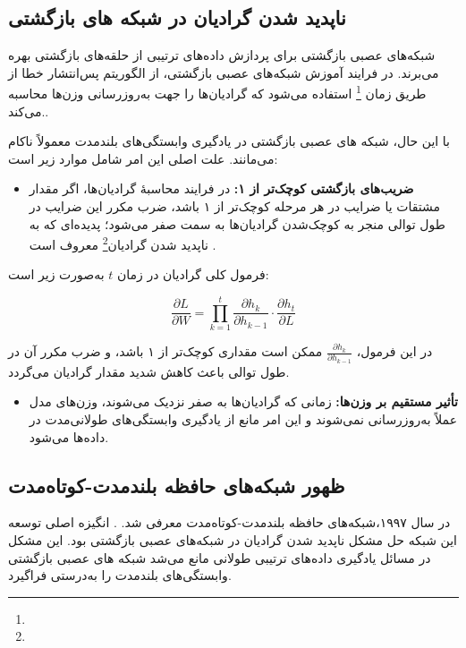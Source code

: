 \subsection{ناپدید شدن گرادیان در شبکه های بازگشتی}
شبکه‌های عصبی بازگشتی برای پردازش داده‌های ترتیبی از حلقه‌های بازگشتی بهره می‌برند. در فرایند آموزش شبکه‌های عصبی بازگشتی، از الگوریتم پس‌انتشار خطا از طریق زمان \footnote{} استفاده می‌شود که گرادیان‌ها را جهت به‌روزرسانی وزن‌ها محاسبه می‌کند.\cite{rumelhart1986learning}.

با این حال، شبکه های عصبی بازگشتی در یادگیری وابستگی‌های بلندمدت معمولاً ناکام می‌مانند. علت اصلی این امر شامل موارد زیر است:

\begin{itemize}
	\item \textbf{ضریب‌های بازگشتی کوچک‌تر از ۱:}
	در فرایند محاسبهٔ گرادیان‌ها، اگر مقدار مشتقات یا ضرایب در هر مرحله کوچک‌تر از ۱ باشد، ضرب مکرر این ضرایب در طول توالی منجر به کوچک‌شدن گرادیان‌ها به سمت صفر می‌شود؛ پدیده‌ای که به ناپدید شدن گرادیان\footnote{} معروف است
	\cite{hochreiter1998vanishing}.
\end{itemize}

فرمول کلی گرادیان در زمان \( t \) به‌صورت زیر است:

\begin{equation}
	\frac{\partial L}{\partial W} = \prod_{k=1}^{t} \frac{\partial h_k}{\partial h_{k-1}} \cdot \frac{\partial h_t}{\partial L}
\end{equation}

در این فرمول، \( \frac{\partial h_k}{\partial h_{k-1}} \) ممکن است مقداری کوچک‌تر از ۱ باشد، و ضرب مکرر آن در طول توالی باعث کاهش شدید مقدار گرادیان می‌گردد.

\begin{itemize}
	\item \textbf{تأثیر مستقیم بر وزن‌ها:}
	زمانی که گرادیان‌ها به صفر نزدیک می‌شوند، وزن‌های مدل عملاً به‌روزرسانی نمی‌شوند و این امر مانع از یادگیری وابستگی‌های طولانی‌مدت در داده‌ها می‌شود\cite{goodfellow2016deep}.
\end{itemize}

\subsection{ظهور شبکه‌های حافظه بلندمدت-کوتاه‌مدت}
در سال ۱۹۹۷،شبکه‌های حافظه بلندمدت-کوتاه‌مدت  معرفی شد.
\cite{hochreiter1997long}.
انگیزه اصلی توسعه این شبکه حل مشکل ناپدید شدن گرادیان در شبکه‌های عصبی بازگشتی بود. این مشکل در مسائل یادگیری داده‌های ترتیبی طولانی مانع می‌شد شبکه های عصبی بازگشتی وابستگی‌های بلندمدت را به‌درستی فراگیرد.

